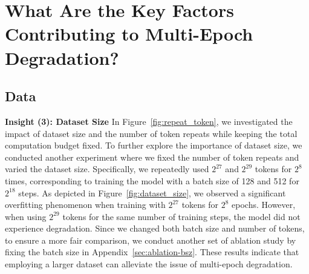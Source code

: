 \documentclass{article}
\newcommand{\ie}{\emph{i.e.,}\xspace}
\begin{document}
\section{What Are the Key Factors Contributing to Multi-Epoch Degradation?}\label{sec:keyfactors}




\subsection{Data}\label{sec:data}


\textbf{Insight (3): Dataset Size} In Figure~\ref{fig:repeat_token}, we investigated the impact of dataset size and the number of token repeats while keeping the total computation budget fixed. To further explore the importance of dataset size, we conducted another experiment where we fixed the number of token repeats and varied the dataset size. Specifically, we repeatedly used $2^{27}$ and $2^{29}$ tokens for $2^8$ times, corresponding to training the model with a batch size of 128 and 512 for $2^{18}$ steps.
As depicted in Figure~\ref{fig:dataset_size}, we observed a significant overfitting phenomenon when training with $2^{27}$ tokens for $2^8$ epochs. However, when using $2^{29}$ tokens for the same number of training steps, the model did not experience degradation. Since we changed both batch size and number of tokens, to ensure a more fair comparison, we conduct another set of ablation study by fixing the batch size in Appendix~\ref{sec:ablation-bsz}.
These results indicate that employing a larger dataset can alleviate the issue of multi-epoch degradation.


\end{document}
